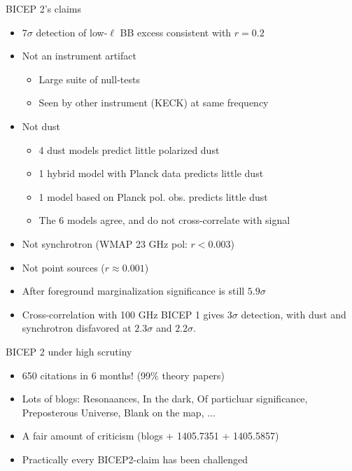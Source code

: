 \documentclass{beamer}
\begin{document}
\begin{frame}{BICEP 2's claims}
	\begin{itemize}
		\item<2-> $7\sigma$ detection of low-$\ell$ BB excess consistent with $r=0.2$
		\item<3-> Not an instrument artifact
			\begin{itemize}
				\item<4-> Large suite of null-tests
				\item<5-> Seen by other instrument (KECK) at same frequency
			\end{itemize}
		\item<6-> Not dust
			\begin{itemize}
				\item<7-> 4 dust models predict little polarized dust
				\item<8-> 1 hybrid model with Planck data predicts little dust
				\item<9-> 1 model based on Planck pol. obs. predicts little dust
				\item<10-> The 6 models agree, and do not cross-correlate with signal
			\end{itemize}
		\item<11-> Not synchrotron (WMAP 23 GHz pol: $r<0.003$)
		\item<12-> Not point sources ($r\approx0.001$)
		\item<13-> After foreground marginalization significance is still $5.9\sigma$
		\item<14-> Cross-correlation with 100 GHz BICEP 1 gives $3\sigma$ detection,
			with dust and synchrotron disfavored at $2.3\sigma$ and $2.2\sigma$.
	\end{itemize}
\end{frame}
%

\begin{frame}{BICEP 2 under high scrutiny}
	\begin{itemize}
		\item<2-> 650 citations in 6 months! (99\% theory papers)
		\item<3-> Lots of blogs: Resonaances, In the dark, Of particluar significance, Preposterous Universe, Blank on the map, ...
		\item<4-> A fair amount of criticism (blogs + 1405.7351 + 1405.5857)
		\item<5-> Practically every BICEP2-claim has been challenged
	\end{itemize}
\end{frame}
\end{document}
